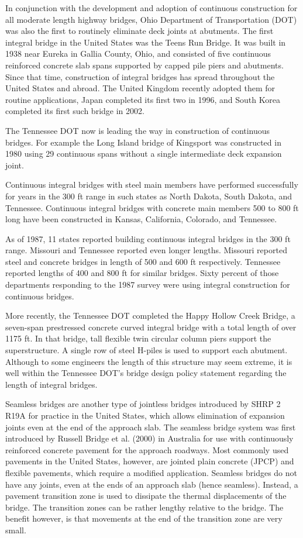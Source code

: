 In conjunction with the development and adoption of continuous construction for all moderate length highway bridges, Ohio Department of Transportation (DOT) was also the first to routinely eliminate deck joints at abutments. The first integral bridge in the United States was the Teens Run Bridge. It was built in 1938 near Eureka in Gallia County, Ohio, and consisted of five continuous reinforced concrete slab spans supported by capped pile piers and abutments. Since that time, construction of integral bridges has spread throughout the United States and abroad. The United Kingdom recently adopted them for routine applications, Japan completed its first two in 1996, and South Korea completed its first such bridge in 2002.

The Tennessee DOT now is leading the way in construction of continuous bridges. For example the Long Island bridge of Kingsport was constructed in 1980 using 29 continuous spans without a single intermediate deck expansion joint.

Continuous integral bridges with steel main members have performed successfully for years in the 300 ft range in such states as North Dakota, South Dakota, and Tennessee. Continuous integral bridges with concrete main members 500 to 800 ft long have been constructed in Kansas, California, Colorado, and Tennessee.

As of 1987, 11 states reported building continuous integral bridges in the 300 ft range. Missouri and Tennessee reported even longer lengths. Missouri reported steel and concrete bridges in length of 500 and 600 ft respectively. Tennessee reported lengths of 400 and 800 ft for similar bridges. Sixty percent of those departments responding to the 1987 survey were using integral construction for continuous bridges.

More recently, the Tennessee DOT completed the Happy Hollow Creek Bridge, a seven-span prestressed concrete curved integral bridge with a total length of over 1175 ft. In that bridge, tall flexible twin circular column piers support the superstructure. A single row of steel H-piles is used to support each abutment. Although to some engineers the length of this structure may seem extreme, it is well within the Tennessee DOT’s bridge design policy statement regarding the length of integral bridges.

Seamless bridges are another type of jointless bridges introduced by SHRP 2 R19A for practice in the United
States, which allows elimination of expansion joints even at the end of the approach slab. The seamless bridge system
was first introduced by Russell Bridge et al. (2000) in Australia for use with continuously reinforced concrete
pavement for the approach roadways. Most commonly used pavements in the United States, however, are jointed
plain concrete (JPCP) and flexible pavements, which require a modified application. Seamless bridges do not have
any joints, even at the ends of an approach slab (hence seamless). Instead, a pavement transition zone is used to
dissipate the thermal displacements of the bridge. The transition zones can be rather lengthy relative to the bridge. The
benefit however, is that movements at the end of the transition zone are very small.

